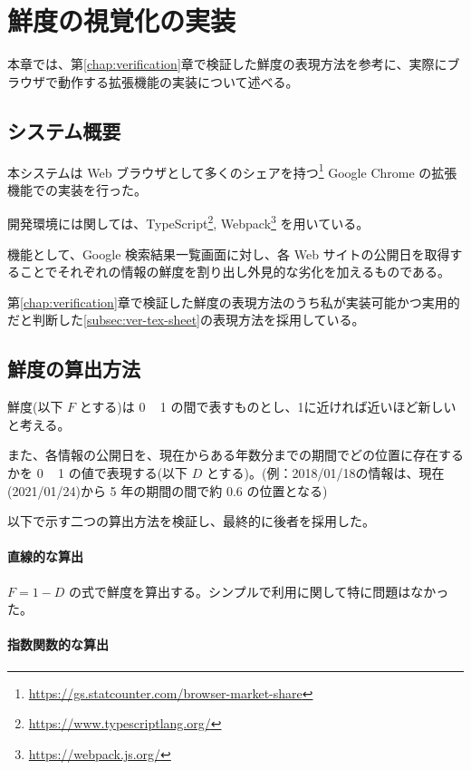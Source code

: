 \chapter{鮮度の視覚化の実装}
\label{chap:implementation}

本章では、第\ref{chap:verification}章で検証した鮮度の表現方法を参考に、実際にブラウザで動作する拡張機能の実装について述べる。

\section{システム概要}
\label{sec:imp_system}

本システムは Web ブラウザとして多くのシェアを持つ\footnote{\url{https://gs.statcounter.com/browser-market-share}} Google Chrome の拡張機能での実装を行った。

開発環境には関しては、TypeScript\footnote{\url{https://www.typescriptlang.org/}}, Webpack\footnote{\url{https://webpack.js.org/}} を用いている。

機能として、Google 検索結果一覧画面に対し、各 Web サイトの公開日を取得することでそれぞれの情報の鮮度を割り出し外見的な劣化を加えるものである。

第\ref{chap:verification}章で検証した鮮度の表現方法のうち私が実装可能かつ実用的だと判断した\ref{subsec:ver-tex-sheet}の表現方法を採用している。

\section{鮮度の算出方法}
\label{sec:imp_calculation}

鮮度(以下 $F$ とする)は 0 ~ 1 の間で表すものとし、1に近ければ近いほど新しいと考える。

また、各情報の公開日を、現在からある年数分までの期間でどの位置に存在するかを 0 ~ 1 の値で表現する(以下 $D$ とする)。(例：2018/01/18の情報は、現在(2021/01/24)から 5 年の期間の間で約 0.6 の位置となる)

以下で示す二つの算出方法を検証し、最終的に後者を採用した。

\subsubsection{直線的な算出}

$ F = 1 - D $ の式で鮮度を算出する。シンプルで利用に関して特に問題はなかった。

\subsubsection{指数関数的な算出}

